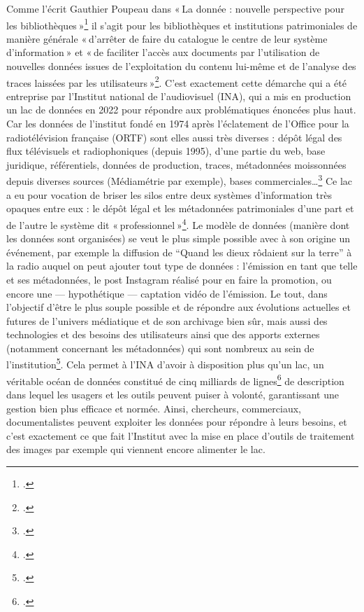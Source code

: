 Comme l’écrit Gauthier Poupeau dans « La donnée : nouvelle perspective pour les bibliothèques »\footcite{poupeau_donnee_2016} il s’agit pour les bibliothèques et institutions patrimoniales de manière générale « d’arrêter de faire du catalogue le centre de leur système d’information » et « de faciliter l’accès aux documents par l’utilisation de nouvelles données issues de l’exploitation du contenu lui-même et de l’analyse des traces laissées par les utilisateurs »\footcite[§ 3]{poupeau_donnee_2016}. C’est exactement cette démarche qui a été entreprise par l’Institut national de l’audiovisuel (INA), qui a mis en production un lac de données en 2022 pour répondre aux problématiques énoncées plus haut. Car les données de l’institut fondé en 1974 après l’éclatement de l’Office pour la radiotélévision française (ORTF) sont elles aussi très diverses : dépôt légal des flux télévisuels et radiophoniques (depuis 1995), d’une partie du web, base juridique, référentiels, données de production, traces, métadonnées moissonnées depuis diverses sources (Médiamétrie par exemple), bases commerciales…\footcite{alquier2024} Ce lac a eu pour vocation de briser les silos entre deux systèmes d’information très opaques entre eux : le dépôt légal et les métadonnées patrimoniales d’une part et de l’autre le système dit « professionnel »\footcite[p. 195]{dribault_dujardin_levolution_2020}. Le modèle de données (manière dont les données sont organisées) se veut le plus simple possible avec à son origine un événement, par exemple la diffusion de \enquote{Quand les dieux rôdaient sur la terre} à la radio auquel on peut ajouter tout type de données : l’émission en tant que telle et ses métadonnées, le post Instagram réalisé pour en faire la promotion, ou encore une — hypothétique — captation vidéo de l’émission. Le tout, dans l’objectif d’être le plus souple possible et de répondre aux évolutions actuelles et futures de l’univers médiatique et de son archivage bien sûr, mais aussi des technologies et des besoins des utilisateurs ainsi que des apports externes (notamment concernant les métadonnées) qui sont nombreux au sein de l’institution\footcite[p. 198]{dribault_dujardin_levolution_2020}. Cela permet à l’INA d’avoir à disposition plus qu’un lac, un véritable océan de données constitué de cinq milliards de lignes\footcite{alquier2024} de description dans lequel les usagers et les outils peuvent puiser à volonté, garantissant une gestion bien plus efficace et normée. Ainsi, chercheurs, commerciaux, documentalistes peuvent exploiter les données pour répondre à leurs besoins, et c’est exactement ce que fait l’Institut avec la mise en place d’outils de traitement des images par exemple qui viennent encore alimenter le lac.



